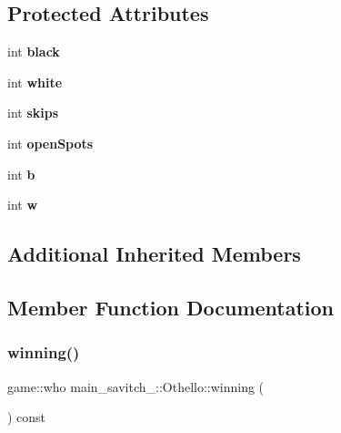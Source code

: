 \subsection*{Protected Attributes}
\begin{DoxyCompactItemize}
\item 
\mbox{\label{classmain__savitch__14_1_1_othello_a2eed818925f68d5678b78107a3298138}} 
int {\bfseries black}
\item 
\mbox{\label{classmain__savitch__14_1_1_othello_a7d5f59b1e581ed7a8145debeecf4f310}} 
int {\bfseries white}
\item 
\mbox{\label{classmain__savitch__14_1_1_othello_a85d4ce17512d8dbf85a313a27eea0644}} 
int {\bfseries skips}
\item 
\mbox{\label{classmain__savitch__14_1_1_othello_a15045e3e94c34afe08240885e230d502}} 
int {\bfseries open\+Spots}
\item 
\mbox{\label{classmain__savitch__14_1_1_othello_a98fbc46241d2f5e05ccb4b66f11535bf}} 
int {\bfseries b}
\item 
\mbox{\label{classmain__savitch__14_1_1_othello_a1b11c5fe33e30a94ed39e8cb55caf37e}} 
int {\bfseries w}
\end{DoxyCompactItemize}
\subsection*{Additional Inherited Members}


\subsection{Member Function Documentation}
\mbox{\label{classmain__savitch__14_1_1_othello_a4ea78b18eea66c944c0a9356349e0fd4}} 
\subsubsection{\texorpdfstring{winning()}{winning()}}
{\footnotesize\ttfamily game\+::who main\+\_\+savitch\+\_\+::\+Othello\+::winning (\begin{DoxyParamCaption}{ }\end{DoxyParamCaption}) const\hspace{0.3cm}{\ttfamily [virtual]}}

